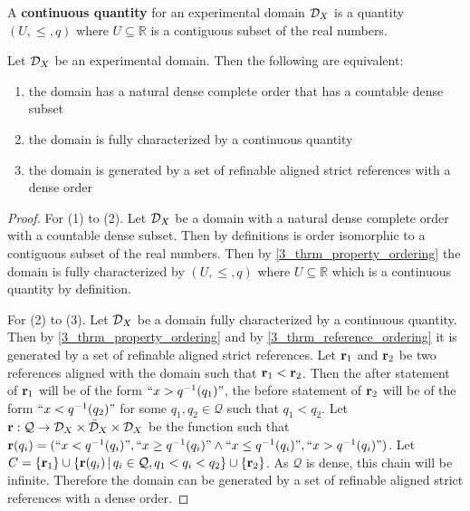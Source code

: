 \documentclass[11pt,letterpaper,fleqn]{memoir} %
\begin{document}
\begin{mathSection}
	\begin{defn}
		A \textbf{continuous quantity} for an experimental domain $\mathcal{D}_X$ is a quantity $(U, \leq, q)$ where $U \subseteq \mathbb{R}$ is a contiguous subset of the real numbers.
	\end{defn}
\begin{thrm}\label{3_thrm_continuous_ordering}
	Let $\mathcal{D}_X$ be an experimental domain. Then the following are equivalent:
	\begin{enumerate}
		\item the domain has a natural dense complete order that has a countable dense subset
		\item the domain is fully characterized by a continuous quantity
		\item the domain is generated by a set of refinable aligned strict references with a dense order
	\end{enumerate}
\end{thrm}
\begin{proof}
	For (1) to (2). Let $\mathcal{D}_X$ be a domain with a natural dense complete order with a countable dense subset. Then by definitions is order isomorphic to a contiguous subset of the real numbers. Then by \ref{3_thrm_property_ordering} the domain is fully characterized by $(U, \leq, q)$ where $U \subseteq \mathbb{R}$ which is a continuous quantity by definition.
	
	For (2) to (3). Let $\mathcal{D}_X$ be a domain fully characterized by a continuous quantity. Then by \ref{3_thrm_property_ordering} and by \ref{3_thrm_reference_ordering} it is generated by a set of refinable aligned strict references.	Let $\textbf{r}_1$ and $\textbf{r}_2$ be two references aligned with the domain such that $\textbf{r}_1 < \textbf{r}_2$. Then the after statement of $\textbf{r}_1$ will be of the form $``x > q^{-1}(q_1)"$, the before statement of $\textbf{r}_2$ will be of the form $``x < q^{-1}(q_2)"$ for some $q_1, q_2 \in \mathcal{Q}$ such that $q_1 < q_2$. Let $\textbf{r} : \mathcal{Q} \to \mathcal{D}_X \times \bar{\mathcal{D}}_X \times \mathcal{D}_X$ be the function such that $\textbf{r}(q_i) = (``x < q^{-1}(q_i)", ``x \geq q^{-1}(q_i)" \wedge ``x \leq q^{-1}(q_i)", ``x > q^{-1}(q_i)")$. Let $C = \{\textbf{r}_1\} \cup \{\textbf{r}(q_i) \, | \, q_i \in \mathcal{Q}, q_1 < q_i < q_2  \} \cup \{ \textbf{r}_2 \}$. As $\mathcal{Q}$ is dense, this chain will be infinite. Therefore the domain can be generated by a set of refinable aligned strict references with a dense order.
	

\end{proof}
\end{mathSection}
\end{document}
